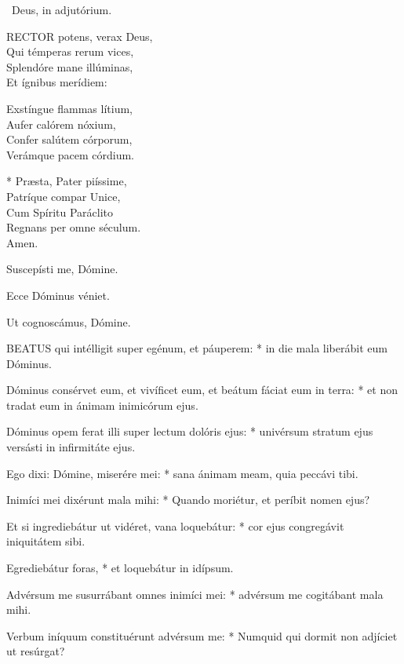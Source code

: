 \V\ Deus, in adjutórium.


\lettrine[lines=2]{R}{ECTOR} potens, verax Deus,\\
Qui témperas rerum vices,\\
Splendóre mane illúminas,\\
Et ígnibus merídiem:

Exstíngue flammas lítium,\\
Aufer calórem nóxium,\\
Confer salútem córporum,\\
Verámque pacem córdium.

* Præsta, Pater piíssime,\\
Patríque compar Unice,\\
Cum Spíritu Paráclito\\
Regnans per omne séculum.\\
Amen.

  Suscepísti me, Dómine.


  Ecce Dóminus véniet.

  Ut cognoscámus, Dómine.


\lettrine[lines=2]{B}{EATUS} qui intélligit super egénum, et páuperem: * in die mala liberábit eum Dóminus.

Dóminus consérvet eum, et vivíficet eum, et beátum fáciat eum in terra: * et non tradat eum in ánimam inimicórum ejus.

Dóminus opem ferat illi super lectum dolóris ejus: * univérsum stratum ejus versásti in infirmitáte ejus.

Ego dixi: Dómine, miserére mei: * sana ánimam meam, quia peccávi tibi.

Inimíci mei dixérunt mala mihi: * Quando moriétur, et períbit nomen ejus?

Et si ingrediebátur ut vidéret, vana loquebátur: * cor ejus congregávit iniquitátem sibi.

Egrediebátur foras, * et loquebátur in idípsum.

Advérsum me susurrábant omnes inimíci mei: * advérsum me cogitábant mala mihi.

Verbum iníquum constituérunt advérsum me: * Numquid qui dormit non adjíciet ut resúrgat?

